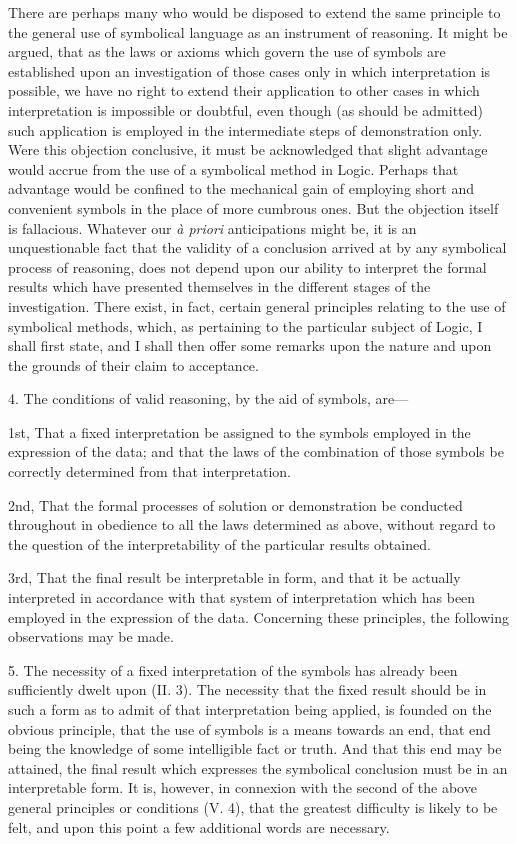 \documentclass[oneside]{book}
\begin{document}
There are perhaps many who would be disposed to extend
the same principle to the general use of symbolical language as
an instrument of reasoning. It might be argued, that as the
laws or axioms which govern the use of symbols are established
upon an investigation of those cases only in which interpretation
is possible, we have no right to extend their application to other
cases in which interpretation is impossible or doubtful, even
though (as should be admitted) such application is employed in
the intermediate steps of demonstration only. Were this objection conclusive, it must be acknowledged that slight advantage
would accrue from the use of a symbolical method in
Logic. Perhaps that advantage would be confined to the mechanical gain of employing short and convenient symbols in the
place of more cumbrous ones. But the objection itself is fallacious. Whatever our \textit{\`{a} priori} anticipations might be, it is an
unquestionable fact that the validity of a conclusion arrived at
by any symbolical process of reasoning, does not depend upon
our ability to interpret the formal results which have presented
themselves in the different stages of the investigation. There
exist, in fact, certain general principles relating to the use of
symbolical methods, which, as pertaining to the particular subject
of Logic, I shall first state, and I shall then offer some remarks
upon the nature and upon the grounds of their claim to
acceptance.

4. The conditions of valid reasoning, by the aid of symbols,
are---

1st, That a fixed interpretation be assigned to the symbols
employed in the expression of the data; and that the laws of the
combination of those symbols be correctly determined from that
interpretation.

2nd, That the formal processes of solution or demonstration
be conducted throughout in obedience to all the laws determined
as above, without regard to the question of the interpretability
of the particular results obtained.

3rd, That the final result be interpretable in form, and that
it be actually interpreted in accordance with that system of interpretation
which has been employed in the expression of the
data. Concerning these principles, the following observations
may be made.

5. The necessity of a fixed interpretation of the symbols has
already been sufficiently dwelt upon (II. 3). The necessity that
the fixed result should be in such a form as to admit of that interpretation
being applied, is founded on the obvious principle,
that the use of symbols is a means towards an end, that end
being the knowledge of some intelligible fact or truth. And
that this end may be attained, the final result which expresses
the symbolical conclusion must be in an interpretable form. It
is, however, in connexion with the second of the above general
principles or conditions (V. 4), that the greatest difficulty is
likely to be felt, and upon this point a few additional words are
necessary.
\end{document}
